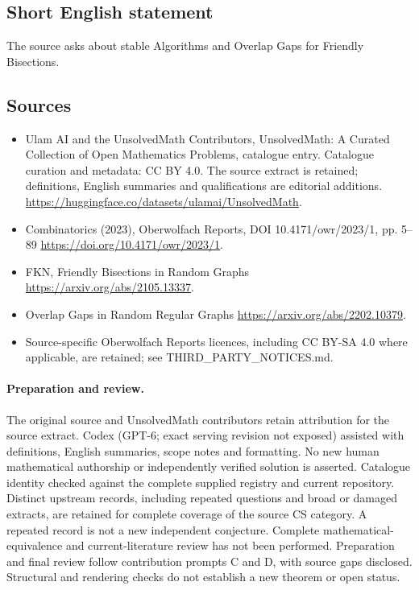 \documentclass[11pt]{article}
\begin{document}
\subsection{Short English statement}
The source asks about stable Algorithms and Overlap Gaps for Friendly Bisections.
\subsection{Sources}
\begin{itemize}
\item[\hypertarget{source:statement:1}{S1}] Ulam AI and the UnsolvedMath Contributors, UnsolvedMath: A Curated Collection of Open Mathematics Problems, catalogue entry. Catalogue curation and metadata: CC BY 4.0. The source extract is retained; definitions, English summaries and qualifications are editorial additions.
\url{https://huggingface.co/datasets/ulamai/UnsolvedMath}.
\item[\hypertarget{source:statement:2}{S2}] Combinatorics (2023), Oberwolfach Reports, DOI 10.4171/owr/2023/1, pp. 5--89
\url{https://doi.org/10.4171/owr/2023/1}.
\item[\hypertarget{source:statement:3}{S3}] FKN, Friendly Bisections in Random Graphs
\url{https://arxiv.org/abs/2105.13337}.
\item[\hypertarget{source:statement:4}{S4}] Overlap Gaps in Random Regular Graphs
\url{https://arxiv.org/abs/2202.10379}.
\item Source-specific Oberwolfach Reports licences, including CC BY-SA 4.0 where applicable, are retained; see THIRD\_PARTY\_NOTICES.md.
\end{itemize}
\paragraph{Preparation and review.}
The original source and UnsolvedMath contributors retain attribution for the source extract. Codex (GPT-6; exact serving revision not exposed) assisted with definitions, English summaries, scope notes and formatting. No new human mathematical authorship or independently verified solution is asserted. Catalogue identity checked against the complete supplied registry and current repository. Distinct upstream records, including repeated questions and broad or damaged extracts, are retained for complete coverage of the source CS category. A repeated record is not a new independent conjecture. Complete mathematical-equivalence and current-literature review has not been performed. Preparation and final review follow contribution prompts C and D, with source gaps disclosed. Structural and rendering checks do not establish a new theorem or open status.
\label{end:statement}
\end{document}
